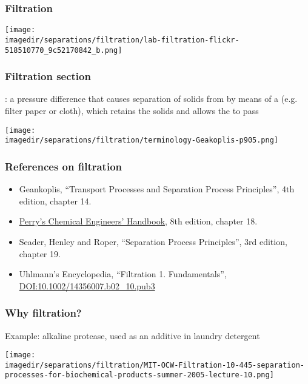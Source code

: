 
\begin{frame}\frametitle{Filtration}
	\begin{center}
		\texttt{[image: \\imagedir/separations/filtration/lab-filtration-flickr-518510770\_9c52170842\_b.png]}
	\end{center}
\end{frame}

\begin{frame}\frametitle{Filtration section}
	{\color{purple}{Filtration}}: a pressure difference that causes separation of solids from {\color{purple}{slurry}} by means of a {\color{purple}{porous medium}} (e.g. filter paper or cloth), which retains the solids and allows the {\color{purple}{filtrate}} to pass

	\begin{center}
		\texttt{[image: \\imagedir/separations/filtration/terminology-Geakoplis-p905.png]}
	\end{center}
\end{frame}

\begin{frame}\frametitle{References on filtration}
	\begin{itemize}
		\item	Geankoplis, ``Transport Processes and Separation Process Principles'', 4th edition, chapter 14.
		\item	\href{http://accessengineeringlibrary.com/browse/perrys-chemical-engineers-handbook-eighth-edition}{Perry's Chemical Engineers' Handbook}, 8th edition, chapter 18.
		\item	Seader, Henley and Roper, ``Separation Process Principles'', 3rd edition, chapter 19.
		\item	Uhlmann's Encyclopedia, ``Filtration 1. Fundamentals'', {\tiny \href{http://onlinelibrary.wiley.com/doi/10.1002/14356007.b02\_10.pub3/abstract}{DOI:10.1002/14356007.b02\_10.pub3}}
	\end{itemize}
\end{frame}

\begin{frame}\frametitle{Why filtration?}
	Example: alkaline protease, used as an additive in laundry detergent
	\begin{center}
		\texttt{[image: \\imagedir/separations/filtration/MIT-OCW-Filtration-10-445-separation-processes-for-biochemical-products-summer-2005-lecture-10.png]}
	\end{center}
\end{frame}

